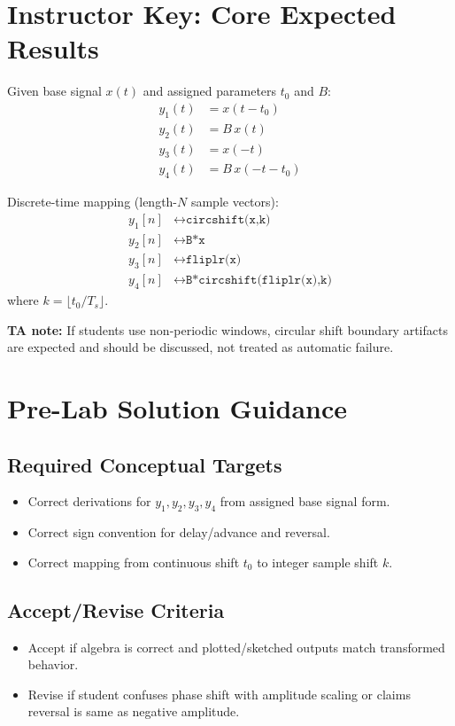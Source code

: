 \documentclass[11pt,letterpaper]{article}
\begin{document}
\section{Instructor Key: Core Expected Results}

Given base signal $x(t)$ and assigned parameters $t_0$ and $B$:
\[
\begin{aligned}
y_1(t) &= x(t-t_0) \\
y_2(t) &= B\,x(t) \\
y_3(t) &= x(-t) \\
y_4(t) &= B\,x(-t-t_0)
\end{aligned}
\]

Discrete-time mapping (length-$N$ sample vectors):
\[
\begin{aligned}
y_1[n] &\leftrightarrow \texttt{circshift(x,k)} \\
y_2[n] &\leftrightarrow \texttt{B*x} \\
y_3[n] &\leftrightarrow \texttt{fliplr(x)} \\
y_4[n] &\leftrightarrow \texttt{B*circshift(fliplr(x),k)}
\end{aligned}
\]
where $k = \lfloor t_0/T_s \rfloor$.

\textbf{TA note:} If students use non-periodic windows, circular shift boundary artifacts are expected and should be discussed, not treated as automatic failure.

\section{Pre-Lab Solution Guidance}

\subsection*{Required Conceptual Targets}
\begin{itemize}[leftmargin=1.2em]
    \item Correct derivations for $y_1,y_2,y_3,y_4$ from assigned base signal form.
    \item Correct sign convention for delay/advance and reversal.
    \item Correct mapping from continuous shift $t_0$ to integer sample shift $k$.
\end{itemize}

\subsection*{Accept/Revise Criteria}
\begin{itemize}[leftmargin=1.2em]
    \item Accept if algebra is correct and plotted/sketched outputs match transformed behavior.
    \item Revise if student confuses phase shift with amplitude scaling or claims reversal is same as negative amplitude.
\end{itemize}
\end{document}
